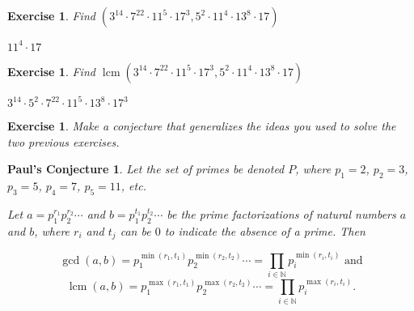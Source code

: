 \documentclass{article}
\DeclareMathOperator{\lcm}{lcm}
\newtheorem{ex}[thm]{Exercise}
\newtheorem{PC}{Paul's Conjecture}
\numberwithin{equation}{thm}
\begin{document}
\begin{ex} \label{2.14}
  Find $(3^14 \cdot 7^22 \cdot 11^5 \cdot 17^3, 5^2 \cdot 11^4 \cdot 13^8 \cdot 17)$
\end{ex}

$11^4 \cdot 17$



\begin{ex} \label{2.15}
  Find $\lcm (3^14 \cdot 7^22 \cdot 11^5 \cdot 17^3, 5^2 \cdot 11^4 \cdot 13^8 \cdot 17)$
\end{ex}

$3^14 \cdot 5^2 \cdot 7^22 \cdot 11^5 \cdot 13^8 \cdot 17^3$



\begin{ex} \label{2.16}
  Make a conjecture that generalizes the ideas you used to solve the two previous exercises.
\end{ex}

\begin{PC} \label{PC 2.16}
  Let the set of primes be denoted $P$, where $p_1 = 2$, $p_2 = 3$, $p_3 = 5$, $p_4 = 7$, $p_5 = 11$, etc.

  Let $a = p_1^{r_1} p_2^{r_2} \cdots$ and $b = p_1^{t_1} p_2^{t_2} \cdots$ be the prime factorizations of natural numbers $a$ and $b$, where $r_i$ and $t_j$ can be $0$ to indicate the absence of a prime. Then

  $$\gcd (a, b) = p_1^{\min(r_1, t_1)} p_2^{\min(r_2, t_2)} \cdots = \prod_{i \in \mathbb{N}} p_i^{\min(r_i, t_i)} \mbox{ and}$$
  $$\lcm (a, b) = p_1^{\max(r_1, t_1)} p_2^{\max(r_2, t_2)} \cdots = \prod_{i \in \mathbb{N}} p_i^{\max(r_i, t_i)}.$$
\end{PC}
\end{document}
